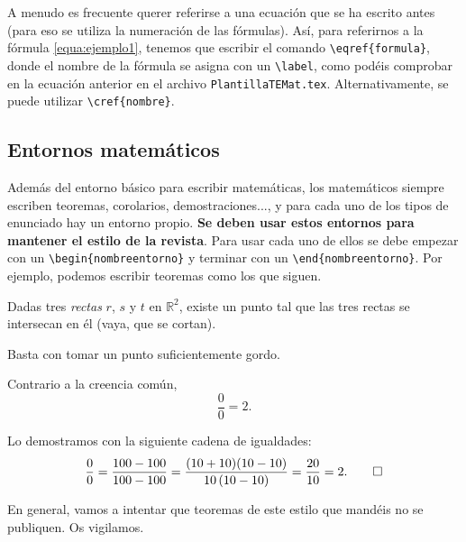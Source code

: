 \documentclass[bibtex, anon]{TEMat-article}
\begin{document}
A menudo es frecuente querer referirse a una ecuación que se ha escrito antes (para eso se utiliza la numeración de las fórmulas).
Así, para referirnos a la fórmula \eqref{equa:ejemplo1}, tenemos que escribir el comando \verb+\eqref{formula}+, donde el nombre de la fórmula se asigna con un \verb+\label+, como podéis comprobar en la ecuación anterior en el archivo \verb+PlantillaTEMat.tex+.
Alternativamente, se puede utilizar \verb+\cref{nombre}+.

\subsection{Entornos matemáticos}

Además del entorno básico para escribir matemáticas, los matemáticos siempre escriben teoremas, corolarios, demostraciones..., y para cada uno de los tipos de enunciado hay un entorno propio.
\textbf{Se deben usar estos entornos para mantener el estilo de la revista}.
Para usar cada uno de ellos se debe empezar con un \verb+\begin{nombreentorno}+ y terminar con un \verb+\end{nombreentorno}+.
Por ejemplo, podemos escribir teoremas como los que siguen.

\begin{teorema}\label{teor:ejemplo1}
Dadas tres \emph{rectas} $r$,\/ $s$ y\/ $t$ en\/ $\mathbb{R}^2$, existe un punto tal que las tres rectas se intersecan en él (vaya, que se cortan).
\end{teorema}

\begin{demostracion}
Basta con tomar un punto suficientemente gordo.
\end{demostracion}

\begin{teorema}\label{teor:ejemplo2}
Contrario a la creencia común,
\[\frac{0}{0}=2.\]
\end{teorema}

\begin{demostracion}
Lo demostramos con la siguiente cadena de igualdades:
\[\frac{0}{0}=\frac{100-100}{100-100}=\frac{(10+10)(10-10)}{10\,(10-10)}=\frac{20}{10}=2.\qedhere\]
\end{demostracion}

\begin{nota*}
En general, vamos a intentar que teoremas de este estilo que mandéis no se publiquen. Os vigilamos.
\end{nota*}
\end{document}
